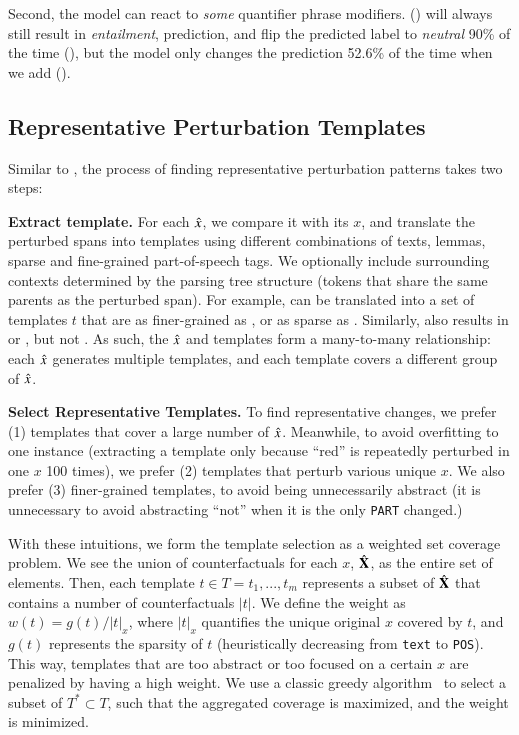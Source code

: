 Second, the model can react to \emph{some} quantifier phrase modifiers. 
 () will always still result in \emph{entailment}, prediction,  and  flip the predicted label to \emph{neutral} 90\% of the time (), but the model only changes the prediction 52.6\% of the time when we add  ().


\subsection{Representative Perturbation Templates}
\label{appendix:err_analysis_template}

Similar to \citet{wu2020tempura}, the process of finding representative perturbation patterns takes two steps:

\textbf{Extract template.}
For each $\hat{x}$, we compare it with its $x$, and translate the perturbed spans into templates using different combinations of texts, lemmas, sparse and fine-grained part-of-speech tags.
We optionally include surrounding contexts determined by the parsing tree structure (tokens that share the same parents as the perturbed span).
For example,  can be translated into a set of templates $t$ that are as finer-grained as , or as sparse as .
Similarly,  also results in  or , but not .
As such, the $\hat{x}$ and templates form a many-to-many relationship: each $\hat{x}$ generates multiple templates, and each template covers a different group of $\hat{x}$.

\textbf{Select Representative Templates.}
To find representative changes, we prefer (1) templates that cover a large number of $\hat{x}$.
Meanwhile, to avoid overfitting to one instance (\eg extracting a template  only because ``red'' is repeatedly perturbed in one $x$ 100 times), we prefer (2) templates that perturb various unique $x$.
We also prefer (3) finer-grained templates, to avoid being unnecessarily abstract (\eg it is unnecessary to avoid abstracting ``not'' when it is the only \texttt{PART} changed.)


With these intuitions, we form the template selection as a weighted set coverage problem.
We see the union of counterfactuals for each $x$, $\hat{\mathbf{X}}$, as the entire set of elements.
Then, each template $t \in T = {t_1,...,t_m}$ represents a subset of $\hat{\mathbf{X}}$ that contains a number of counterfactuals $|t|$.
We define the weight as $w(t) = g(t) / |t|_x$, where $|t|_x$ quantifies the unique original $x$ covered by $t$, and $g(t)$ represents the sparsity of $t$ (heuristically decreasing from \texttt{text} to \texttt{POS}).
This way, templates that are too abstract or too focused on a certain $x$ are penalized by having a high weight. 
We use a classic greedy algorithm~\cite{vazirani2013approximation} to select a subset of $T^* \subset T$, such that the aggregated coverage is maximized, and the weight is minimized.
